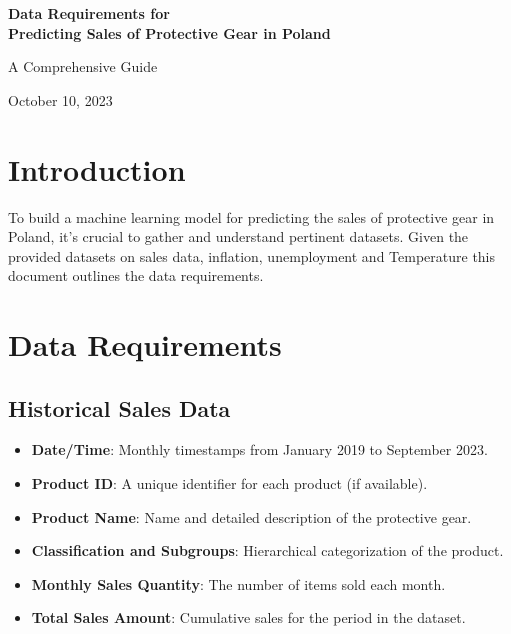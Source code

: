 \documentclass{article}
\begin{document}
\begin{titlepage}
    \centering
    \vspace*{4cm}
    {\Huge\bfseries Data Requirements for \\ Predicting Sales of Protective Gear in Poland \par}
    \vspace{2cm}
    {\large A Comprehensive Guide \par}
    \vfill
    \vspace{2cm}
    {\large October 10, 2023\par}
\end{titlepage}

\newpage
\tableofcontents
\newpage    

\section{Introduction}
To build a machine learning model for predicting the sales of protective gear in Poland, it's crucial to gather and understand pertinent datasets. Given the provided datasets on sales data, inflation, unemployment and Temperature this document outlines the data requirements.

\section{Data Requirements}

\subsection{Historical Sales Data}

\begin{itemize}
    \item \textbf{Date/Time}: Monthly timestamps from January 2019 to September 2023.
    \item \textbf{Product ID}: A unique identifier for each product (if available).
    \item \textbf{Product Name}: Name and detailed description of the protective gear.
    \item \textbf{Classification and Subgroups}: Hierarchical categorization of the product.
    \item \textbf{Monthly Sales Quantity}: The number of items sold each month.
    \item \textbf{Total Sales Amount}: Cumulative sales for the period in the dataset.
\end{itemize}
\end{document}
